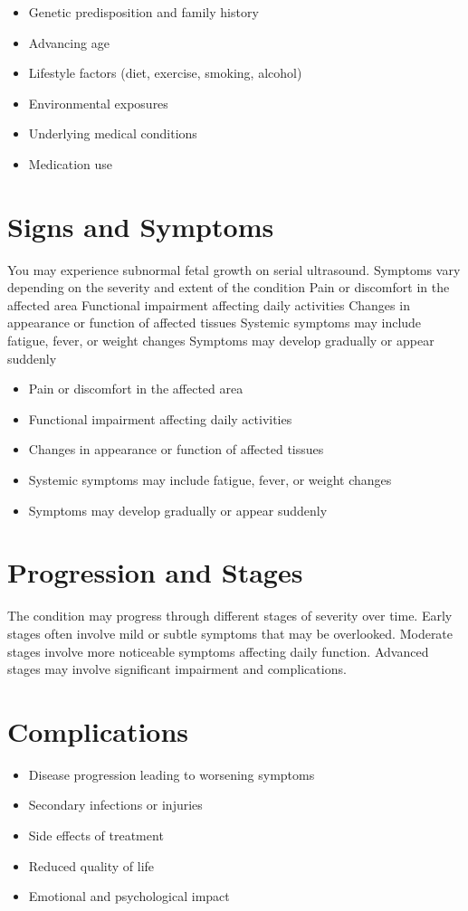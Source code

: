 \begin{itemize}[noitemsep]
  \item Genetic predisposition and family history
  \item Advancing age
  \item Lifestyle factors (diet, exercise, smoking, alcohol)
  \item Environmental exposures
  \item Underlying medical conditions
  \item Medication use
\end{itemize}
\section{Signs and Symptoms}
You may experience subnormal fetal growth on serial ultrasound. Symptoms vary depending on the severity and extent of the condition Pain or discomfort in the affected area Functional impairment affecting daily activities Changes in appearance or function of affected tissues Systemic symptoms may include fatigue, fever, or weight changes Symptoms may develop gradually or appear suddenly

\begin{itemize}[noitemsep]
  \item Pain or discomfort in the affected area
  \item Functional impairment affecting daily activities
  \item Changes in appearance or function of affected tissues
  \item Systemic symptoms may include fatigue, fever, or weight changes
  \item Symptoms may develop gradually or appear suddenly
\end{itemize}
\section{Progression and Stages}
The condition may progress through different stages of severity over time. Early stages often involve mild or subtle symptoms that may be overlooked. Moderate stages involve more noticeable symptoms affecting daily function. Advanced stages may involve significant impairment and complications.
\section{Complications}
\begin{itemize}[noitemsep]
  \item Disease progression leading to worsening symptoms
  \item Secondary infections or injuries
  \item Side effects of treatment
  \item Reduced quality of life
  \item Emotional and psychological impact
\end{itemize}
